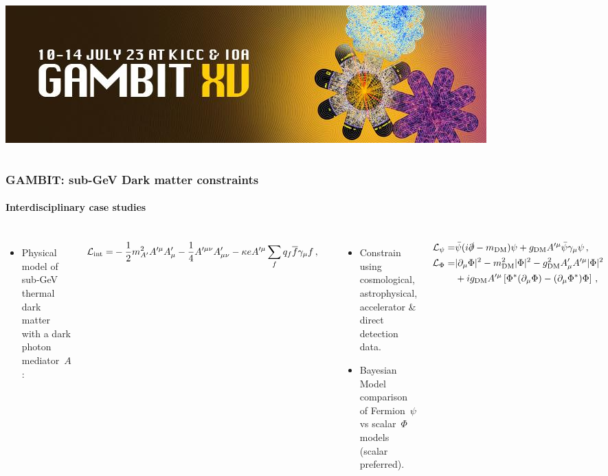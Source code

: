 \documentclass[aspectratio=169]{beamer}
\begin{document}
\begin{frame}
\begin{columns}
        \includegraphics[width=\textwidth]{figures/gambit_meetingbanner.jpg}
    \end{columns}
\end{frame}

\begin{frame}
    \frametitle{GAMBIT: sub-GeV Dark matter constraints}
    \framesubtitle{Interdisciplinary case studies}
    \begin{columns}
        \begin{itemize}
            \item Physical model of sub-GeV thermal dark matter with a dark photon mediator~$A$:
        \end{itemize}
        \vspace{-10pt}
        \begin{align*}
            \small
            \mathcal{L}_\text{int} =& -\frac{1}{2} m_{A'}^2 A'^\mu A'_\mu - \frac{1}{4} A'^{\mu\nu}A'_{\mu\nu} -\kappa e A'^\mu \sum_{f} q_f \overline{f} \gamma_\mu f \,,
            \normalsize
        \end{align*}
        \vspace{-15pt}
        \begin{itemize}
            \item Constrain using cosmological, astrophysical, accelerator \& direct detection data.
            \item Bayesian Model comparison of Fermion~$\psi$ vs scalar~$\Phi$ models (scalar preferred).
        \end{itemize}
        \vspace{-10pt}
        \begin{align*}
            \small
            \mathcal{L}_\psi  =& \bar{\psi}(i \slashed{\partial} - m_\text{DM}) \psi + g_\text{DM} A'^\mu \bar{\psi} \gamma_\mu \psi \,,\\
            \mathcal{L}_\Phi  =& |\partial_\mu \Phi|^2 - m_\text{DM}^2 |\Phi|^2 - g_\text{DM}^2 A'_\mu A'^\mu |\Phi|^2 \\ &+ i g_\text{DM} A'^\mu \left[\Phi^\ast (\partial_\mu \Phi) - (\partial_\mu \Phi^\ast) \Phi\right]\,,

\end{align*}
\end{columns}
\end{frame}
\end{document}
